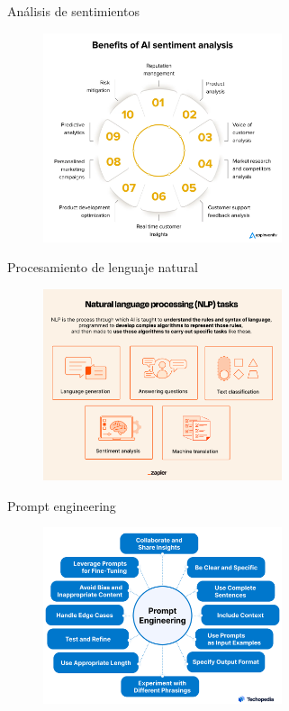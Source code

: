 \documentclass[aspectratio=169,xcolor=dvipsnames, t]{beamer}
\begin{document}

\begin{frame}{Análisis de sentimientos}
    \begin{figure}
    \includegraphics[width=7cm]{style_data/img/sentiment_analisis.png}
    \centering
    \end{figure}
\end{frame}


\begin{frame}{Procesamiento de lenguaje natural}
    \begin{figure}
    \includegraphics[width=7cm]{style_data/img/pnl.png}
    \centering
    \end{figure}
\end{frame}


\begin{frame}{Prompt engineering}
    \begin{figure}
    \includegraphics[width=7cm]{style_data/img/Prompt-Engineering-Best-Practices.png}
    \centering
    \end{figure}
\end{frame}
\end{document}
